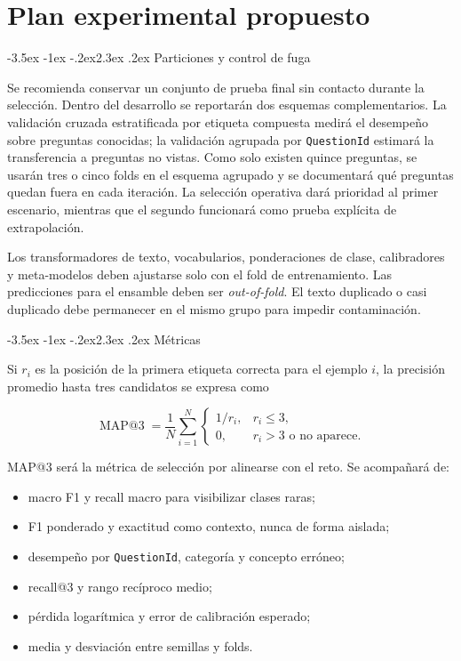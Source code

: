 \documentclass[11pt,oneside,openany]{book}
\makeatletter
\renewcommand\section{\@startsection{section}{1}{\z@}%
  {-3.5ex \@plus -1ex \@minus -.2ex}{2.3ex \@plus .2ex}%
  {\normalfont\Large\sffamily\bfseries\color{AzulMedio}}}
\newcommand{\codigo}[1]{\texttt{#1}}
\makeatother
\begin{document}
\chapter{Plan experimental propuesto}

\section{Particiones y control de fuga}

Se recomienda conservar un conjunto de prueba final sin contacto durante la
selección. Dentro del desarrollo se reportarán dos esquemas complementarios. La
validación cruzada estratificada por etiqueta compuesta medirá el desempeño sobre
preguntas conocidas; la validación agrupada por \codigo{QuestionId} estimará la
transferencia a preguntas no vistas. Como solo existen quince preguntas, se
usarán tres o cinco folds en el esquema agrupado y se documentará qué preguntas
quedan fuera en cada iteración. La selección operativa dará prioridad al primer
escenario, mientras que el segundo funcionará como prueba explícita de
extrapolación.

Los transformadores de texto, vocabularios, ponderaciones de clase, calibradores y
meta-modelos deben ajustarse solo con el fold de entrenamiento. Las predicciones
para el ensamble deben ser \emph{out-of-fold}. El texto duplicado o casi duplicado
debe permanecer en el mismo grupo para impedir contaminación.

\section{Métricas}

Si $r_i$ es la posición de la primera etiqueta correcta para el ejemplo $i$, la
precisión promedio hasta tres candidatos se expresa como

\[
\operatorname{MAP@3}=\frac{1}{N}\sum_{i=1}^{N}
\begin{cases}
1/r_i, & r_i\leq3,\\
0, & r_i>3\text{ o no aparece}.
\end{cases}
\]

MAP@3 será la métrica de selección por alinearse con el reto. Se acompañará de:

\begin{itemize}
  \item macro F1 y recall macro para visibilizar clases raras;
  \item F1 ponderado y exactitud como contexto, nunca de forma aislada;
  \item desempeño por \codigo{QuestionId}, categoría y concepto erróneo;
  \item recall@3 y rango recíproco medio;
  \item pérdida logarítmica y error de calibración esperado;
  \item media y desviación entre semillas y folds.
\end{itemize}
\end{document}
